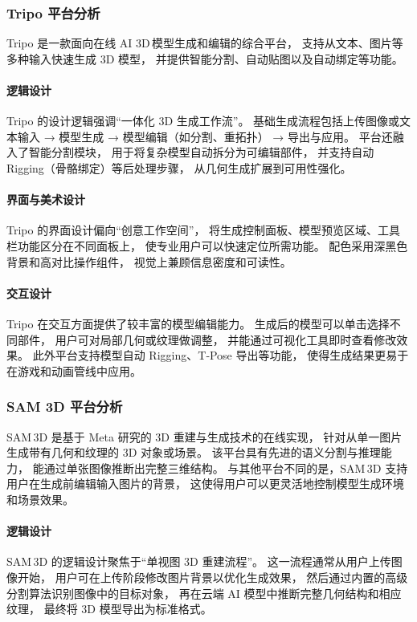 \subsubsection{Tripo 平台分析}

Tripo 是一款面向在线 AI 3D 模型生成和编辑的综合平台，  
支持从文本、图片等多种输入快速生成 3D 模型，  
并提供智能分割、自动贴图以及自动绑定等功能。  

\paragraph{逻辑设计}  
Tripo 的设计逻辑强调“一体化 3D 生成工作流”。  
基础生成流程包括上传图像或文本输入 → 模型生成 → 模型编辑（如分割、重拓扑） → 导出与应用。  
平台还融入了智能分割模块，  
用于将复杂模型自动拆分为可编辑部件，  
并支持自动 Rigging（骨骼绑定）等后处理步骤，  
从几何生成扩展到可用性强化。  

\paragraph{界面与美术设计}  
Tripo 的界面设计偏向“创意工作空间”，  
将生成控制面板、模型预览区域、工具栏功能区分在不同面板上，  
使专业用户可以快速定位所需功能。  
配色采用深黑色背景和高对比操作组件，  
视觉上兼顾信息密度和可读性。   

\paragraph{交互设计}  
Tripo 在交互方面提供了较丰富的模型编辑能力。  
生成后的模型可以单击选择不同部件，  
用户可对局部几何或纹理做调整，  
并能通过可视化工具即时查看修改效果。  
此外平台支持模型自动 Rigging、T‑Pose 导出等功能，  
使得生成结果更易于在游戏和动画管线中应用。  

\subsubsection{SAM 3D 平台分析}

SAM 3D 是基于 Meta 研究的 3D 重建与生成技术的在线实现，  
针对从单一图片生成带有几何和纹理的 3D 对象或场景。  
该平台具有先进的语义分割与推理能力，  
能通过单张图像推断出完整三维结构。  
与其他平台不同的是，SAM 3D 支持用户在生成前编辑输入图片的背景，  
这使得用户可以更灵活地控制模型生成环境和场景效果。  

\paragraph{逻辑设计}  
SAM 3D 的逻辑设计聚焦于“单视图 3D 重建流程”。  
这一流程通常从用户上传图像开始，  
用户可在上传阶段修改图片背景以优化生成效果，  
然后通过内置的高级分割算法识别图像中的目标对象，  
再在云端 AI 模型中推断完整几何结构和相应纹理，  
最终将 3D 模型导出为标准格式。  

